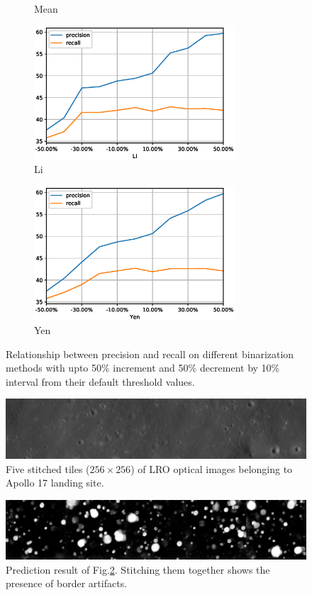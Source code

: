 \documentclass[11pt]{article}
\begin{document}
\begin{figure}[H]
\begin{subfigure}{7cm}
		\caption{Mean}
	\end{subfigure}
	\begin{subfigure}{7cm}
		\centering\includegraphics[width=7.5cm]{files/results/li.eps}
		\caption{Li}
	\end{subfigure}
	\begin{subfigure}[b]{1.0\textwidth}
		\centering
		\includegraphics[width=7.5cm]{files/results/yen.eps}
		\caption{Yen}
	\end{subfigure}

	\caption{Relationship between precision and recall on different binarization methods with upto 50\% increment and 50\% decrement by 10\% interval from their default threshold values.}
	\label{thresh_methods}
\end{figure}

\begin{figure}[H]
	\centering
	\includegraphics[width=.8\textwidth]{files/results/hcon_thesis-1_original.png}
	\caption{Five stitched tiles ($256 \times 256$) of LRO optical images belonging to Apollo 17 landing site.}
	\label{original}
\end{figure}

\begin{figure}[H]
	\centering
	\includegraphics[width=.8\textwidth]{files/results/hcon_thesis-1.png}
	\caption{Prediction result of Fig.\ref{original}. Stitching them together shows the presence of border artifacts.}
	\label{artifacts}
\end{figure}
\end{document}
